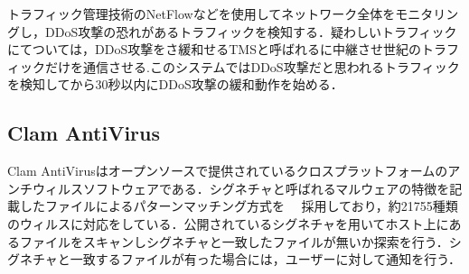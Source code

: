 トラフィック管理技術のNetFlowなどを使用してネットワーク全体をモニタリングし，DDoS攻撃の恐れがあるトラフィックを検知する．疑わしいトラフィックにてついては，DDoS攻撃をさ緩和せるTMSと呼ばれるに中継させ世紀のトラフィックだけを通信させる.このシステムではDDoS攻撃だと思われるトラフィックを検知してから30秒以内にDDoS攻撃の緩和動作を始める．

\subsection{Clam AntiVirus}

Clam AntiVirusはオープンソースで提供されているクロスプラットフォームのアンチウィルスソフトウェアである．シグネチャと呼ばれるマルウェアの特徴を記載したファイルによるパターンマッチング方式を　
採用しており，約21755種類のウィルスに対応をしている．公開されているシグネチャを用いてホスト上にあるファイルをスキャンしシグネチャと一致したファイルが無いか探索を行う．シグネチャと一致するファイルが有った場合には，ユーザーに対して通知を行う．
